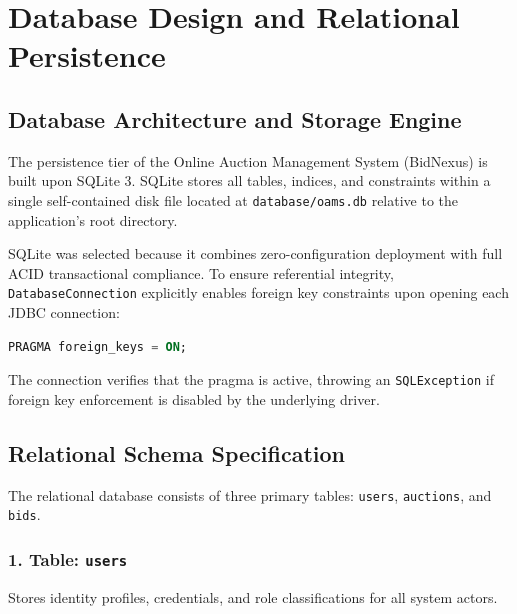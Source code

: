 \section{Database Design and Relational Persistence}
\label{sec:database_design}

\subsection{Database Architecture and Storage Engine}
The persistence tier of the Online Auction Management System (BidNexus) is built upon SQLite 3. SQLite stores all tables, indices, and constraints within a single self-contained disk file located at \texttt{database/oams.db} relative to the application's root directory.

SQLite was selected because it combines zero-configuration deployment with full ACID transactional compliance. To ensure referential integrity, \texttt{DatabaseConnection} explicitly enables foreign key constraints upon opening each JDBC connection:
\begin{lstlisting}[language=SQL]
PRAGMA foreign_keys = ON;
\end{lstlisting}
The connection verifies that the pragma is active, throwing an \texttt{SQLException} if foreign key enforcement is disabled by the underlying driver.

\subsection{Relational Schema Specification}
The relational database consists of three primary tables: \texttt{users}, \texttt{auctions}, and \texttt{bids}.

\subsubsection{1. Table: \texttt{users}}
Stores identity profiles, credentials, and role classifications for all system actors.

